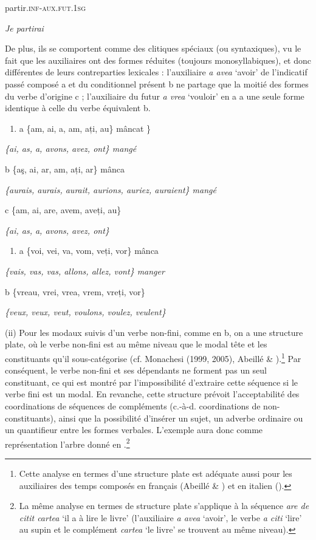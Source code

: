     partir.\textsc{inf}-\textsc{aux.fut.1sg}

{\itshape
    Je partirai}

De plus, ils se comportent comme des clitiques spéciaux (ou syntaxiques), vu le fait que les auxiliaires ont des formes réduites (toujours monosyllabiques), et donc différentes de leurs contreparties lexicales : l'auxiliaire \textit{a avea} `avoir' de l'indicatif passé composé a et du conditionnel présent b ne partage que la moitié des formes du verbe d'origine c ; l'auxiliaire du futur \textit{a vrea} `vouloir' en a a une seule forme identique à celle du verbe équivalent b.  


\begin{enumerate}
\item \label{bkm:Ref307433669}a  \{am, ai, a, am, ați, au\} mâncat \}  


\end{enumerate}
{\itshape
\{ai, as, a, avons, avez, ont\} mangé}

b  \{aş, ai, ar, am, ați, ar\} mânca

{\itshape
\{aurais, aurais, aurait, aurions, auriez, auraient\} mangé} 

c  \{am, ai, are, avem, aveți, au\}

{\itshape
\{ai, as, a, avons, avez, ont\}}


\begin{enumerate}
\item \label{bkm:Ref307433880}a  \{voi, vei, va, vom, veți, vor\} mânca  


\end{enumerate}
{\itshape
\{vais, vas, vas, allons, allez, vont\} manger}

b  \{vreau, vrei, vrea, vrem, vreți, vor\}

    \textit{\{veux, veux, veut, voulons, voulez, veulent\}}

(ii) Pour les modaux suivis d'un verbe non-fini, comme en b, on a une structure plate, où le verbe non-fini est au même niveau que le modal tête et les constituants qu'il sous-catégorise (cf. Monachesi (1999, 2005), Abeillé \& \citet{Godard2003}).\footnote{Cette analyse en termes d'une structure plate est adéquate aussi pour les auxiliaires des temps composés en français (Abeillé \& \citet{Godard2003}) et en italien (\citet{Monachesi2005}).} Par conséquent, le verbe non-fini et ses dépendants ne forment pas un seul constituant, ce qui est montré par l'impossibilité d'extraire cette séquence si le verbe fini est un modal. En revanche, cette structure prévoit l'acceptabilité des coordinations de séquences de compléments (c.-à-d. coordinations de non-constituants), ainsi que la possibilité d'insérer un sujet, un adverbe ordinaire ou un quantifieur entre les formes verbales. L'exemple  aura donc comme représentation l'arbre donné en .\footnote{La même analyse en termes de structure plate s'applique à la séquence \textit{are de citit cartea} `il a à lire le livre' (l'auxiliaire \textit{a avea} `avoir', le verbe \textit{a citi} `lire' au supin et le complément \textit{cartea} `le livre' se trouvent au même niveau).}


